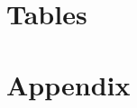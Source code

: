 \documentclass[11pt, oneside]{article}
\begin{document}
\begin{comment}
However, these stories of discrimination against \textit{guests} provide only anecdotal evidence for the larger problem of discrimination in the Airbnb market. The problem of discrimination against \textit{hosts} is not publicized, even though it just as important because it affects the prices, revenues, and sometimes livelihoods of thousands of Airbnb hosts. 



\iffalse %
\begin{quotation}
``Suppose there are two groups, designated by $W$ and $N$, with members of $W$ being perfect substitutes in production for members of $N$. In the absence of discrimination and nepotism and if the labor market were perfectly competitive, the equilibrium wage rate of $W$ would equal that of $N$. Discrimination could cause these wage rates to differ; the market discrimination coefficient between $W$ and $N$ [...] is defined as the proportional difference between these wage rates" \end{quotation}
 \fi
\end{comment}


\newpage
\singlespacing

\section*{Tables}


\section*{Appendix}


\newpage
\end{document}
